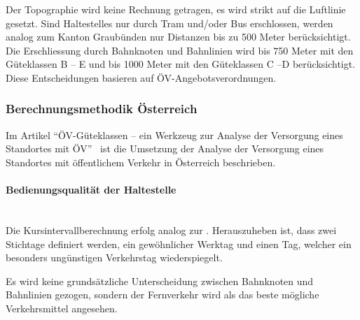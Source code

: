 Der Topographie wird keine Rechnung getragen, es wird strikt auf die Luftlinie gesetzt.
Sind \glspl{Haltestelle} nur durch Tram und/oder Bus erschlossen, werden analog zum Kanton Graubünden nur Distanzen bis zu 500 Meter berücksichtigt.
Die Erschliessung durch Bahnknoten und Bahnlinien wird bis 750 Meter mit den Güteklassen B -- E und bis 1000 Meter mit den Güteklassen C --D berücksichtigt.
Diese Entscheidungen basieren auf ÖV-Angebotsverordnungen.

\subsubsection{Berechnungsmethodik Österreich}
\label{Lösungsansätze:Berechnungsmethodik Österreich}

Im Artikel "`\gls{ÖV-Güteklassen} – ein Werkzeug zur Analyse der 
Versorgung eines Standortes mit ÖV"'~\cite{berechnung_oesterreich} ist die Umsetzung der Analyse der Versorgung eines Standortes mit öffentlichem Verkehr in Österreich beschrieben.

\paragraph{Bedienungsqualität der Haltestelle}~\\
\label{Berechnungsmethodik Österreich:Bedienungsqualität der Haltestelle}
Die Kursintervallberechnung erfolg analog zur .
Herauszuheben ist, dass zwei Stichtage definiert werden, ein gewöhnlicher Werktag und einen Tag, welcher ein besonders ungünstigen Verkehrstag wiederspiegelt.

Es wird keine grundsätzliche Unterscheidung zwischen Bahnknoten und Bahnlinien gezogen, sondern der Fernverkehr wird als das beste mögliche Verkehrsmittel angesehen.

